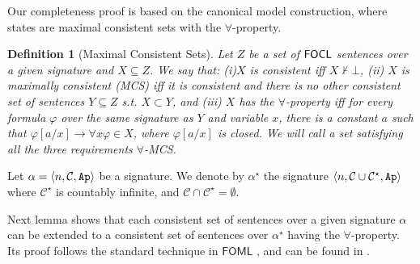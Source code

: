 \documentclass{article}
\newtheorem{definition}{Definition}
\begin{document}
Our completeness proof is based on the canonical model construction, where states are maximal consistent sets with the $\forall$-property.

\begin{definition}[Maximal Consistent Sets]
Let $Z$ be a set of $\mathsf{FOCL}$ sentences over a given signature and $X\subseteq Z$. We say that: (i)$X$ is \emph{consistent} iff $X\not\vdash \bot$, (ii) $X$ is \emph{maximally consistent} (MCS) iff it is consistent and there is no other consistent set of sentences $Y\subseteq Z$ s.t. $X\subset Y$, %
and (iii) $X$ has the \emph{$\forall$-property} iff for every formula $\varphi$ over the same signature as $Y$  and variable $x$, there is a constant $a$ such that $\varphi[a/x]\to \forall x \varphi\in X$, where $\varphi[a/x]$ is closed. We will call a set satisfying all the three requirements $\forall$-MCS.

\end{definition}


Let $\alpha=\langle n,\mathcal{C},\texttt{Ap} \rangle$ be a signature. We denote by $\alpha^\star$ the signature $\langle n,\mathcal{C}\cup \mathcal{C}^\star,\texttt{Ap} \rangle$ where $\mathcal{C}^\star$ is countably infinite, and $\mathcal{C}\cap \mathcal{C}^\star = \emptyset$. 

Next lemma shows  that each consistent set of sentences over a given signature $\alpha$  can be extended to a consistent set of sentences over $\alpha^\star$ having the $\forall$-property.  Its proof follows the standard technique in $\mathsf{FOML}$ \cite{Cresswell1996-CREANI-3}, and can be found in \cite{csl}. %
\end{document}
